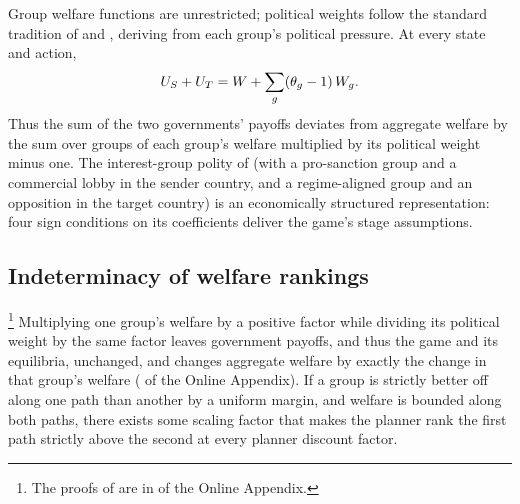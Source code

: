 Group welfare functions are unrestricted; political weights follow the standard
tradition of \citet{GrossmanHelpman1994} and \citet{Becker1983}, deriving from each
group's political pressure. At every state and action,
\begin{equation}
U_S+U_T=W+\sum_g(\theta_g-1)\,W_g .
\label{eq:welfare-identity}
\end{equation}
Thus the sum of the two governments' payoffs deviates from aggregate welfare by the sum
over groups of each group's welfare multiplied by its political weight minus one. The
interest-group polity of \citet{Kaempfer1988} (with a pro-sanction group and a
commercial lobby in the sender country, and a regime-aligned group and an opposition in
the target country) is an economically structured representation: four sign
conditions on its coefficients deliver the game's stage assumptions.

\subsection{Indeterminacy of welfare rankings}
\label{sec:welfare:nonidentification}

\footnote{The proofs of
 are in
 of the Online Appendix.} Multiplying one group's welfare by a
positive factor while dividing its political weight by the same factor leaves
government payoffs, and thus the game and its equilibria, unchanged, and changes
aggregate welfare by exactly the change in that group's welfare
( of the Online Appendix). If a group is strictly better
off along one path than another by a uniform margin, and welfare is bounded along both
paths, there exists some scaling factor that makes the planner rank the first path
strictly above the second at every planner discount factor.

